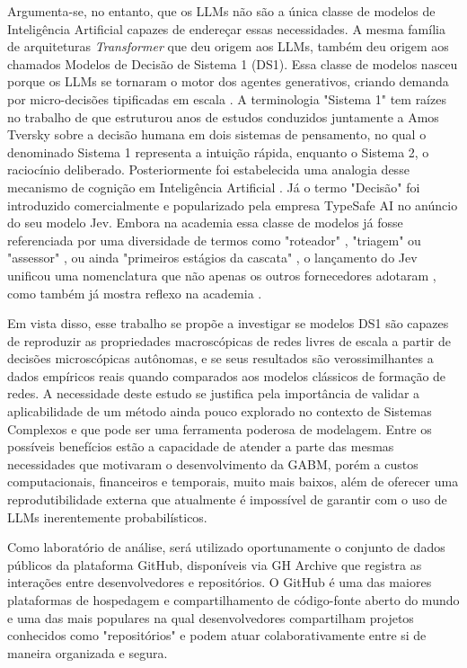 \documentclass[12pt,oneside,a4paper,brazil,sumario=tradicional]{abntex2}
\begin{document}
Argumenta-se, no entanto, que os LLMs não são a única classe de modelos de Inteligência Artificial capazes de endereçar essas necessidades. A mesma família de arquiteturas  \textit{Transformer} \parencite{vaswani2017} que deu origem aos LLMs, também deu origem aos chamados Modelos de Decisão de Sistema 1 (DS1). Essa classe de modelos nasceu porque os LLMs se tornaram o motor dos agentes generativos, criando demanda por micro-decisões tipificadas em escala \parencite{chen2023}. A terminologia "Sistema 1" tem raízes no trabalho de \textcite{kahneman2003} que estruturou anos de estudos conduzidos juntamente a Amos Tversky sobre a decisão humana em dois sistemas de pensamento, no qual o denominado Sistema 1 representa a intuição rápida, enquanto o Sistema 2, o raciocínio deliberado. Posteriormente foi estabelecida uma analogia desse mecanismo de cognição em Inteligência Artificial \parencite{bengio2019, booch2021, goyal2022}. Já o termo "Decisão" foi introduzido comercialmente e popularizado pela empresa TypeSafe AI \parencite{typesafe2026} no anúncio do seu modelo Jev. Embora na academia essa classe de modelos já fosse referenciada por uma diversidade de termos como "roteador" \parencite{ong2025}, "triagem" ou "assessor" \parencite{nandakishore2026}, ou ainda "primeiros estágios da cascata" \parencite{chen2023}, o lançamento do Jev unificou uma nomenclatura que não apenas os outros fornecedores adotaram \parencite{microsoft2026, cloudflare2026, openai2026, laya2026}, como também já mostra reflexo na academia \parencite{santos2026}.

Em vista disso, esse trabalho se propõe a investigar se modelos DS1 são capazes de reproduzir as propriedades macroscópicas de redes livres de escala a partir de decisões microscópicas autônomas, e se seus resultados são verossimilhantes a dados empíricos reais quando comparados aos modelos clássicos de formação de redes. A necessidade deste estudo se justifica pela importância de validar a aplicabilidade de um método ainda pouco explorado no contexto de Sistemas Complexos e que pode ser uma ferramenta poderosa de modelagem. Entre os possíveis benefícios estão a capacidade de atender a parte das mesmas necessidades que motivaram o desenvolvimento da GABM, porém a custos computacionais, financeiros e temporais, muito mais baixos, além de oferecer uma reprodutibilidade externa que atualmente é impossível de garantir com o uso de LLMs inerentemente probabilísticos.

Como laboratório de análise, será utilizado oportunamente o conjunto de dados públicos da plataforma GitHub, disponíveis via GH Archive \parencite{grigorik_gharchive} que registra as interações entre desenvolvedores e repositórios. O GitHub é uma das maiores plataformas de hospedagem e compartilhamento de código-fonte aberto do mundo e uma das mais populares \parencite{github2025, stackoverflow2025} na qual desenvolvedores compartilham projetos conhecidos como "repositórios" e podem atuar colaborativamente entre si de maneira organizada e segura.
\end{document}
